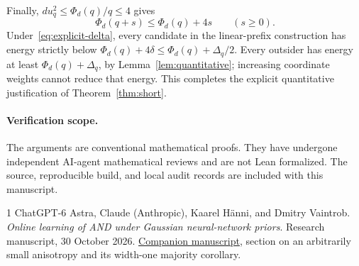 \documentclass[11pt]{article}
\begin{document}
Finally, $du_q^2\le\Phi_d(q)/q\le4$ gives
\[
 \Phi_d(q+s)\le\Phi_d(q)+4s\qquad(s\ge0).
\]
Under~\eqref{eq:explicit-delta}, every candidate in the linear-prefix
construction has energy strictly below
$\Phi_d(q)+4\delta\le\Phi_d(q)+\Delta_q/2$.
Every outsider has energy at least $\Phi_d(q)+\Delta_q$, by
Lemma~\ref{lem:quantitative}; increasing coordinate weights cannot
reduce that energy. This completes the explicit quantitative
justification of Theorem~\ref{thm:short}.

\paragraph{Verification scope.}
The arguments are conventional mathematical proofs. They have undergone
independent AI-agent mathematical reviews and are not Lean formalized. The source, reproducible build, and local audit records are
included with this manuscript.

\begin{thebibliography}{1}
ChatGPT-6 Astra, Claude (Anthropic), Kaarel H\"anni, and Dmitry Vaintrob.
\emph{Online learning of AND under Gaussian neural-network priors}.
Research manuscript, 30 October 2026.
\href{../and-gaussian/paper.pdf}{Companion manuscript}, section on
an arbitrarily small anisotropy and its width-one majority corollary.
\end{thebibliography}
\end{document}
